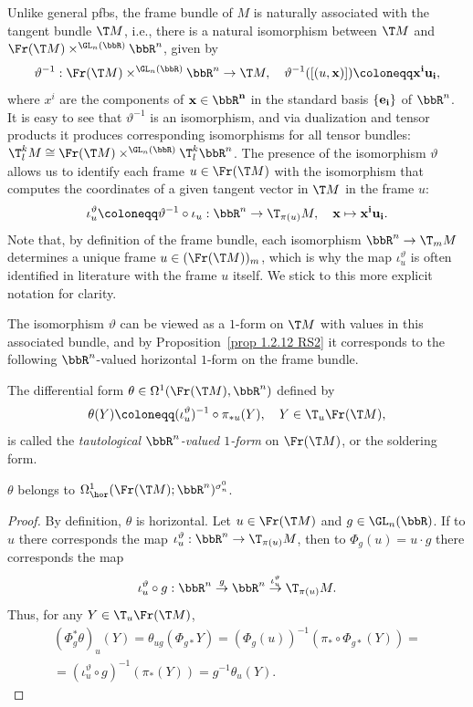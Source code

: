 Unlike general \glspl{pfb}, the frame bundle of $M$ is naturally associated with the tangent bundle $\T M$, i.e., there is a natural isomorphism between $\T M$ and  $\Fr(\T M)\times^{\GL_n(\bbR)}\bbR^n$, given by
\[\vartheta^{-1}:\Fr(\T M) \times^{\GL_n(\bbR)} \bbR^n\to \T M,\quad \vartheta^{-1}([(u,\bf{x})])\coloneqq x^iu_i,\label{eq 2.1.2 RS2}\]
where $x^i$ are the components of $\bf{x}\in\bbR^n$ in the standard basis $\{\bf{e}_i\}$ of $\bbR^n$. It is easy to see that $\vartheta^{-1}$ is an isomorphism, and via dualization and tensor products it produces corresponding isomorphisms for all tensor bundles: $\T^k_l M\cong \Fr(\T M)\times^{\GL_n(\bbR)}\T^k_l\bbR^n$. The presence of the isomorphism $\vartheta$ allows us to identify each frame $u\in \Fr(\T M)$ with the isomorphism that computes the coordinates of a given tangent vector in $\T M$ in the frame $u$:
\[\iota_u^\vartheta\coloneqq \vartheta^{-1}\circ\iota_u:\bbR^n\to \T_{\pi(u)}M,\quad \bf{x}\mapsto x^i u_i.\]
Note that, by definition of the frame bundle, each isomorphism $\bbR^n\to \T_mM$ determines a unique frame $u\in (\Fr(\T M))_m$, which is why the map $\iota_u^\vartheta$ is often identified in literature with the frame $u$ itself. We stick to this more explicit notation for clarity.

The isomorphism $\vartheta$ can be viewed as a $1$-form on $\T M$ with values in this associated bundle, and by Proposition~\ref{prop 1.2.12 RS2} it corresponds to the following $\bbR^n$-valued horizontal $1$-form on the frame bundle.

\begin{defn}
    The differential form $\theta\in\Omega^1(\Fr(\T M),\bbR^n)$ defined by
    \[\theta(Y)\coloneqq (\iota_u^\vartheta)^{-1}\circ\pi_{\ast u}(Y),\quad Y\in \T_u\Fr(\T M),\]
    is called the \emph{tautological $\bbR^n$-valued $1$-form} on $\Fr(\T M)$, or the soldering form.
\end{defn}


\begin{prop}[{{\cite[Prop.~2.1.4]{RS2}}}]\label{prop 2.1.4 RS2}
    $\theta$ belongs to $\Omega^1_{\hor}(\Fr(\T M); \bbR^n)^{\sigma_n^0}$.
\end{prop}
\begin{proof}
    By definition, $\theta$ is horizontal. Let $u\in\Fr(\T M)$ and $g\in \GL_n(\bbR)$. If to $u$ there corresponds the map $\iota^\vartheta_u:\bbR^n\to \T_{\pi(u)}M$, then to $\Phi_g(u)=u\cdot g$ there corresponds the map
    \[\iota_u^\vartheta\circ g:\bbR^n\overset{g}{\to} \bbR^n\overset{\iota_u^\vartheta}{\to} \T_{\pi(u)}M.\] 
    Thus, for any $Y\in \T_u \Fr(\T M)$,
    \begin{multline}
        (\Phi^\ast_g \theta)_u(Y)=\theta_{ug}(\Phi_{g\ast}Y)=(\Phi_g(u))^{-1}(\pi_\ast\circ \Phi_{g\ast}(Y))=\\
        =(\iota_u^\vartheta\circ g)^{-1}(\pi_\ast (Y))=g^{-1}\theta_u(Y).
    \end{multline}
\end{proof}


